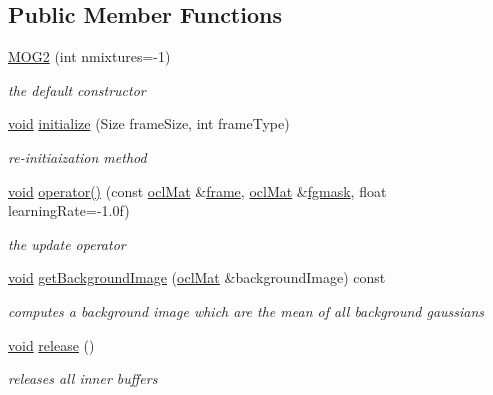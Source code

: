 \subsection*{Public Member Functions}
\begin{DoxyCompactItemize}
\item 
\hyperlink{classcv_1_1ocl_1_1MOG2_a1aa2b563ee8cba2258d9a597994b6b09}{M\-O\-G2} (int nmixtures=-\/1)
\begin{DoxyCompactList}\small\item\em the default constructor \end{DoxyCompactList}\item 
\hyperlink{legacy_8hpp_a8bb47f092d473522721002c86c13b94e}{void} \hyperlink{classcv_1_1ocl_1_1MOG2_af4786e5aa9459ee0ba71f3ebfe209a88}{initialize} (Size frame\-Size, int frame\-Type)
\begin{DoxyCompactList}\small\item\em re-\/initiaization method \end{DoxyCompactList}\item 
\hyperlink{legacy_8hpp_a8bb47f092d473522721002c86c13b94e}{void} \hyperlink{classcv_1_1ocl_1_1MOG2_ace77a23319941aceeadec468a0fcf800}{operator()} (const \hyperlink{classcv_1_1ocl_1_1oclMat}{ocl\-Mat} \&\hyperlink{core__c_8h_a0430deaafd9043e478f306e33961299d}{frame}, \hyperlink{classcv_1_1ocl_1_1oclMat}{ocl\-Mat} \&\hyperlink{legacy_8hpp_a7ff9edf5eaa300d3c1cea7de20631fd8}{fgmask}, float learning\-Rate=-\/1.\-0f)
\begin{DoxyCompactList}\small\item\em the update operator \end{DoxyCompactList}\item 
\hyperlink{legacy_8hpp_a8bb47f092d473522721002c86c13b94e}{void} \hyperlink{classcv_1_1ocl_1_1MOG2_a75bf9d42f37e1b90dc6b1eb3cf8a61a4}{get\-Background\-Image} (\hyperlink{classcv_1_1ocl_1_1oclMat}{ocl\-Mat} \&background\-Image) const 
\begin{DoxyCompactList}\small\item\em computes a background image which are the mean of all background gaussians \end{DoxyCompactList}\item 
\hyperlink{legacy_8hpp_a8bb47f092d473522721002c86c13b94e}{void} \hyperlink{classcv_1_1ocl_1_1MOG2_aa1adac787479b150ff919bb87d136d6a}{release} ()
\begin{DoxyCompactList}\small\item\em releases all inner buffers \end{DoxyCompactList}\end{DoxyCompactItemize}
